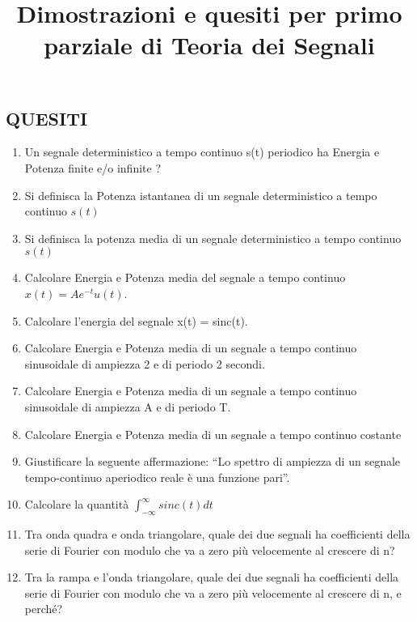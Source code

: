 \documentclass[
]{article}
\title{Dimostrazioni e quesiti per primo parziale di Teoria dei Segnali}
\author{}
\date{}
\begin{document}
	\maketitle

\hypertarget{quesiti}{%
\subsection{QUESITI}\label{quesiti}}

\begin{enumerate}
\def\labelenumi{\arabic{enumi}.}

\item
	Un segnale deterministico a tempo continuo s(t) periodico ha Energia e Potenza finite e/o infinite ?
	
\item
Si definisca la Potenza istantanea di un segnale deterministico a
tempo continuo $s(t)$

\item 
Si definisca la potenza media di un segnale deterministico a tempo continuo $s(t)$

\item
Calcolare Energia e Potenza media del segnale a tempo continuo
\(x(t) = Ae ^{-t} u(t)\).

\item
Calcolare l'energia del segnale x(t) = sinc(t).

\item
Calcolare Energia e Potenza media di un segnale a tempo continuo
sinusoidale di ampiezza 2 e di periodo 2 secondi.
\item
Calcolare Energia e Potenza media di un segnale a tempo continuo
sinusoidale di ampiezza A e di periodo T.

\item
Calcolare Energia e Potenza media di un segnale a tempo continuo
costante

\item
Giustificare la seguente affermazione: ``Lo spettro di ampiezza di un
segnale tempo-continuo aperiodico reale è una funzione pari''.


\item
Calcolare la quantità
\(\displaystyle \int_{- \infty}^{\infty} sinc(t) dt\)
	
\item 
Tra onda quadra e onda triangolare, quale dei due segnali ha coefficienti della serie di Fourier con modulo che
va a zero più velocemente al crescere di n?

\item
Tra la rampa e l'onda triangolare, quale dei due segnali ha
coefficienti della serie di Fourier con modulo che va a zero più
velocemente al crescere di n, e perché?


\end{enumerate}
\end{document}
